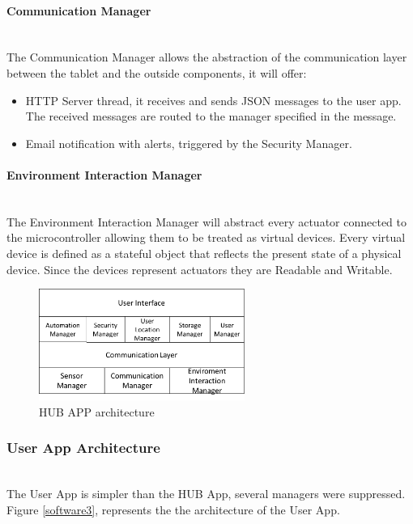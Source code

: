 \paragraph{Communication Manager}\mbox{}\\
The Communication Manager allows the abstraction of the communication layer between the tablet and the outside components, it will offer:

\begin{itemize}
  \item HTTP Server thread, it receives and sends JSON messages to the user app. The received messages are routed to the manager specified in the message.
  \item Email notification with alerts, triggered by the Security Manager.
\end{itemize}

\paragraph{Environment Interaction Manager}\mbox{}\\
The Environment Interaction Manager will abstract every actuator connected to the microcontroller allowing them to be treated as virtual devices. Every virtual device is defined as a stateful object that reflects the present state of a physical device. Since the devices represent actuators they are Readable and Writable.

\begin{figure}[h]
\centering
\includegraphics[width=0.6\textwidth]{Figures/software2}
\caption{HUB APP architecture }
\label{software2}
\end{figure}



\subsubsection{User App Architecture}\mbox{}\\
The User App is simpler than the HUB App, several managers were suppressed. Figure \ref{software3}, represents the the architecture of the User App.

